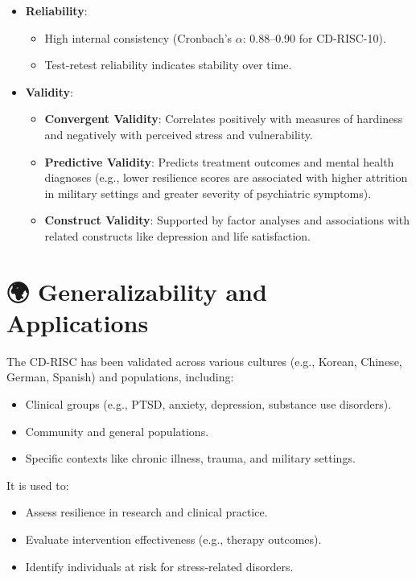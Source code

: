 \documentclass[12pt]{article}
\begin{document}
\begin{itemize}
    \item \textbf{Reliability}:
    \begin{itemize}
        \item High internal consistency (Cronbach’s $\alpha$: 0.88--0.90 for CD-RISC-10).
        \item Test-retest reliability indicates stability over time.
    \end{itemize}
    \item \textbf{Validity}:
    \begin{itemize}
        \item \textbf{Convergent Validity}: Correlates positively with measures of hardiness and negatively with perceived stress and vulnerability.
        \item \textbf{Predictive Validity}: Predicts treatment outcomes and mental health diagnoses (e.g., lower resilience scores are associated with higher attrition in military settings and greater severity of psychiatric symptoms).
        \item \textbf{Construct Validity}: Supported by factor analyses and associations with related constructs like depression and life satisfaction.
    \end{itemize}
\end{itemize}

\section*{🌍 Generalizability and Applications}

The CD-RISC has been validated across various cultures (e.g., Korean, Chinese, German, Spanish) and populations, including:
\begin{itemize}
    \item Clinical groups (e.g., PTSD, anxiety, depression, substance use disorders).
    \item Community and general populations.
    \item Specific contexts like chronic illness, trauma, and military settings.
\end{itemize}

It is used to:
\begin{itemize}
    \item Assess resilience in research and clinical practice.
    \item Evaluate intervention effectiveness (e.g., therapy outcomes).
    \item Identify individuals at risk for stress-related disorders.
\end{itemize}
\end{document}
